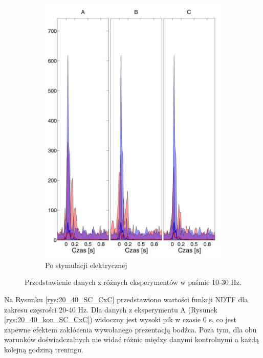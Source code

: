 \documentclass{pracamgr_2}
\begin{document}
\begin{figure}[h]
\begin{subfigure}{.5\textwidth}
			\includegraphics[width=1.\linewidth]{beta3_10-30_z_SC2_do_CxC82.png}
			\caption{Po stymulacji elektrycznej}
			\label{rys:10_30_beta_SC_CxC}
		\end{subfigure}
		\caption{Przedstawienie danych z różnych eksperymentów w paśmie 10-30 Hz.}
		\label{rys:10_30_SC_CxC}
	\end{figure}
	\FloatBarrier
	Na Rysunku \ref{rys:20_40_SC_CxC} przedstawiono wartości funkcji NDTF dla zakresu częsrości 20-40 Hz. Dla danych z eksperymentu A (Rysunek \ref{rys:20_40_kon_SC_CxC}) widoczny jest wysoki pik w czasie 0 s, co jest zapewne efektem zakłócenia wywołanego prezentacją bodźca. Poza tym, dla obu warunków doświadczalnych nie widać różnic między danymi kontrolnymi a każdą kolejną godziną treningu.
\end{document}

